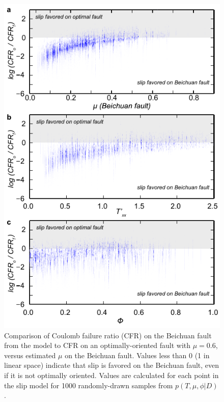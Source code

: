 \documentclass[twocolumn,jgrga]{AGUTeX}
\begin{document}
\begin{article}
\begin{figure}%
\centering
\includegraphics{../figures/cfr_plots.pdf}
\caption{Comparison of Coulomb failure ratio (CFR) on the Beichuan fault
from the \citet{zhang2011} model to CFR on an
optimally-oriented fault with $\mu = 0.6$, versus estimated $\mu$ on the
Beichuan fault. Values less than 0 (1 in linear space) indicate that
slip is favored on the Beichuan fault, even if it is not optimally
oriented. Values are calculated for each point in the slip model for
1000 randomly-drawn samples from $p(T,\mu,\phi |D)$.}
\label{fig:cfr_ratios}
\end{figure}


\end{article}
\end{document}
